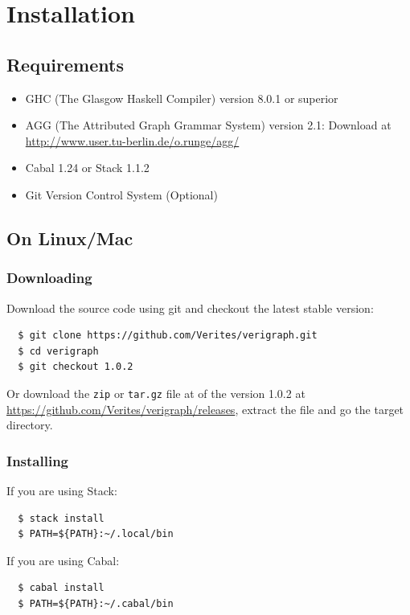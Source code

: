 \documentclass[12pt]{article}
\begin{document}
\pagebreak

\section{Installation}

\subsection{Requirements}
\begin{itemize}
\item GHC (The Glasgow Haskell Compiler) version 8.0.1 or superior
\item AGG (The Attributed Graph Grammar System) version 2.1: Download at \url{http://www.user.tu-berlin.de/o.runge/agg/}
\item Cabal 1.24 or Stack 1.1.2
\item Git Version Control System (Optional)
\end{itemize}

\subsection{On Linux/Mac}

\subsubsection{Downloading}
Download the source code using git and checkout the latest stable version:
\begin{verbatim}
  $ git clone https://github.com/Verites/verigraph.git
  $ cd verigraph
  $ git checkout 1.0.2
\end{verbatim}

\noindent
Or download the \texttt{zip} or \texttt{tar.gz} file at of the version 1.0.2 at \url{https://github.com/Verites/verigraph/releases}, extract the file and go the target directory.

\subsubsection{Installing}

If you are using Stack:
\begin{verbatim}
  $ stack install
  $ PATH=${PATH}:~/.local/bin
\end{verbatim}

\noindent
If you are using Cabal:
\begin{verbatim}
  $ cabal install
  $ PATH=${PATH}:~/.cabal/bin
\end{verbatim}
\end{document}

